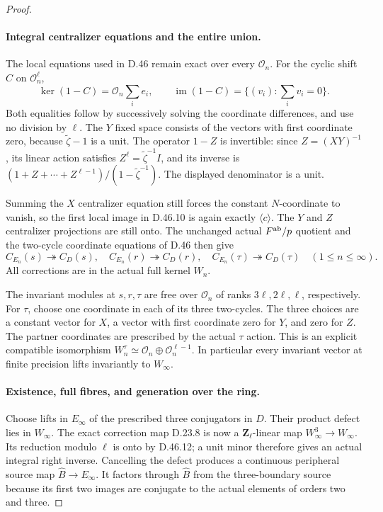 \begin{proof}
\paragraph{Integral centralizer equations and the entire union.}
The local equations used in D.46 remain exact over
every \(\mathcal O_n\). For the cyclic shift
\(C\) on \(\mathcal O_n^\ell\),
\[
 \ker(1-C)=\mathcal O_n\sum_i e_i,
 \qquad
 \operatorname{im}(1-C)
      =\{(v_i):\textstyle\sum_i v_i=0\}.
 \tag{D.48.7}
\]
Both equalities follow by successively solving
the coordinate differences, and use no division
by \(\ell\). The \(Y\) fixed space consists
of the vectors with first coordinate zero,
because \(\widetilde\zeta-1\) is a unit.
The operator \(1-Z\) is invertible: since
\(Z=(XY)^{-1}\), its linear action satisfies
\(Z^\ell=\widetilde\zeta^{-1}I\), and its inverse is
\((1+Z+\cdots+Z^{\ell-1})/(1-\widetilde\zeta^{-1})\).
The displayed denominator is a unit.

Summing the \(X\) centralizer equation still
forces the constant \(N\)-coordinate to vanish,
so the first local image in D.46.10 is again
exactly \(\langle c\rangle\).
The \(Y\) and \(Z\) centralizer projections
are still onto. The unchanged actual
\(F^{\rm ab}/p\) quotient and the two-cycle
coordinate equations of D.46 then give
\[
 C_{E_n}(s)\twoheadrightarrow C_D(s),\quad
 C_{E_n}(r)\twoheadrightarrow C_D(r),\quad
 C_{E_n}(\tau)\twoheadrightarrow C_D(\tau)
       \quad(1\leq n\leq\infty).
 \tag{D.48.8}
\]
All corrections are in the actual full kernel
\(W_n\).

The invariant modules at \(s,r,\tau\) are free
over \(\mathcal O_n\) of ranks
\(3\ell,2\ell,\ell\), respectively.
For \(\tau\), choose one coordinate in each
of its three two-cycles. The three choices
are a constant vector for \(X\), a vector
with first coordinate zero for \(Y\), and
zero for \(Z\). The partner coordinates
are prescribed by the actual \(\tau\)
action. This is an explicit compatible
isomorphism
\(W_n^\tau\simeq\mathcal O_n\oplus
\mathcal O_n^{\ell-1}\).
In particular every invariant vector at
finite precision lifts invariantly to
\(W_\infty\).

\paragraph{Existence, full fibres, and generation over the ring.}
Choose lifts in \(E_\infty\) of the prescribed
three conjugators in \(D\). Their product
defect lies in \(W_\infty\).
The exact correction map D.23.8 is now a
\(\mathbf Z_\ell\)-linear map
\(W_\infty^3\to W_\infty\).
Its reduction modulo \(\ell\) is onto by
D.46.12; a unit minor therefore gives an
actual integral right inverse.
Cancelling the defect produces a continuous
peripheral source map \(\widehat B\to E_\infty\).
It factors through \(\widehat B\) from the
three-boundary source because its first two
images are conjugate to the actual elements
of orders two and three.


\end{proof}
